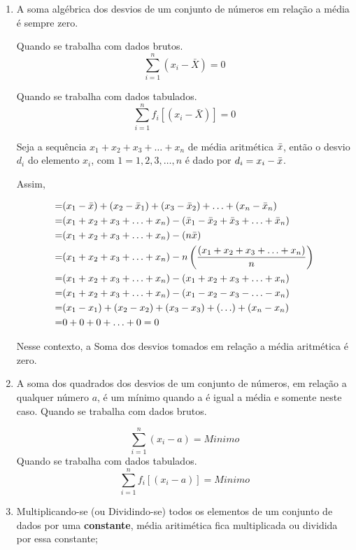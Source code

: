 \begin{enumerate}
\item [{C)}] A soma algébrica dos desvios de um conjunto de números em relação a média é sempre zero.\vskip0.3cm

Quando se trabalha com dados brutos.
$$ \sum_{i=1}^{n}(x_{i}-\bar{X})=0 $$


Quando se trabalha com dados tabulados.
$$ \sum_{i=1}^{n}f_{i}[(x_{i}-\bar{X})]=0 $$


\newpage
\textbf{} 
\vskip0.3cm

Seja a sequência  $x_{1}+x_{2}+x_{3}+\ldots+x_{n}$ de média aritmética $\Bar{x}$, então o desvio $d_{i}$ do elemento $x_{i}$, com $1=1,2,3,\ldots,n$ é dado por $d_{i}=x_{i}-\Bar{x}$.
\vskip0.3cm


Assim, 

\begin{eqnarray*}
= & (x_{1}-\Bar{x})+(x_{2}-\Bar{x}_{1})+(x_{3}-\Bar{x}_{2})+\ldots+(x_{n}-\Bar{x}_{n}) \\
= & (x_{1}+x_{2}+x_{3}+\ldots+x_{n}) - (\Bar{x}_{1}-\Bar{x}_{2}+\Bar{x}_{3}+\ldots+\Bar{x}_{n})\\
= & (x_{1}+x_{2}+x_{3}+\ldots+x_{n})-(n\Bar{x})\\
= & (x_{1}+x_{2}+x_{3}+\ldots+x_{n})-n \left(\frac{(x_{1}+x_{2}+x_{3}+\ldots+x_{n})}{n} \right)\\
= & (x_{1}+x_{2}+x_{3}+\ldots+x_{n})-(x_{1}+x_{2}+x_{3}+\ldots+x_{n})\\
= & (x_{1}+x_{2}+x_{3}+\ldots+x_{n})-(x_{1}-x_{2}-x_{3}-\ldots-x_{n})\\
= & (x_{1}-x_{1})+(x_{2}-x_{2})+(x_{3}-x_{3})+(\ldots)+(x_{n}-x_{n})\\
= & 0+0+0+\ldots+0=0
\end{eqnarray*}

Nesse contexto, a Soma dos desvios tomados em relação a média aritmética é zero.


\item [{D)}] A soma dos quadrados dos desvios de um conjunto de números, em relação a qualquer número $a$, é um mínimo quando a é igual a média e somente neste caso.\vskip0.3cm
Quando se trabalha com dados brutos.

$$ \sum_{i=1}^{n}(x_{i}- a)= Minimo  $$
Quando se trabalha com dados tabulados.
$$ \sum_{i=1}^{n}f_{i}[(x_{i}- a)]= Minimo  $$

\newpage
\item [{E)}] Multiplicando-se (ou Dividindo-se) todos os elementos
de um conjunto de dados por uma \textbf{constante}, média aritimética fica multiplicada ou dividida por essa constante;


\end{enumerate}
